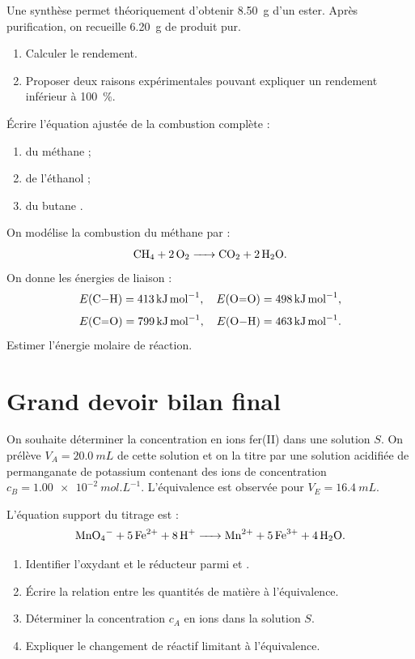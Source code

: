 \documentclass[11pt,a4paper]{article}
\begin{document}
\begin{exercicebox}[title=Exercice 10 - Rendement d'une synthèse]
Une synthèse permet théoriquement d'obtenir \SI{8.50}{g} d'un ester. Après purification, on recueille \SI{6.20}{g} de produit pur.
\begin{enumerate}
\item Calculer le rendement.
\item Proposer deux raisons expérimentales pouvant expliquer un rendement inférieur à \SI{100}{\percent}.
\end{enumerate}
\end{exercicebox}

\begin{exercicebox}[title=Exercice 11 - Combustion complète]
Écrire l'équation ajustée de la combustion complète :
\begin{enumerate}
\item du méthane  ;
\item de l'éthanol  ;
\item du butane .
\end{enumerate}
\end{exercicebox}

\begin{exercicebox}[title=Exercice 12 - Énergie de combustion]
On modélise la combustion du méthane par :
\[
\ce{CH4 + 2O2 -> CO2 + 2H2O}.
\]
On donne les énergies de liaison :
\[
E(\ce{C-H})=\SI{413}{kJ.mol^{-1}},\quad E(\ce{O=O})=\SI{498}{kJ.mol^{-1}},
\]
\[
E(\ce{C=O})=\SI{799}{kJ.mol^{-1}},\quad E(\ce{O-H})=\SI{463}{kJ.mol^{-1}}.
\]
Estimer l'énergie molaire de réaction.
\end{exercicebox}

\newpage

\section{Grand devoir bilan final}

\begin{exercicebox}[title=Devoir bilan - Partie A : dosage et transformation chimique]
On souhaite déterminer la concentration en ions fer(II)  dans une solution $S$. On prélève $V_A=\SI{20.0}{mL}$ de cette solution et on la titre par une solution acidifiée de permanganate de potassium contenant des ions  de concentration $c_B=\SI{1.00e-2}{mol.L^{-1}}$. L'équivalence est observée pour $V_E=\SI{16.4}{mL}$.

L'équation support du titrage est :
\[
\ce{MnO4^- + 5Fe^{2+} + 8H+ -> Mn^{2+} + 5Fe^{3+} + 4H2O}.
\]
\begin{enumerate}
\item Identifier l'oxydant et le réducteur parmi  et .
\item Écrire la relation entre les quantités de matière à l'équivalence.
\item Déterminer la concentration $c_A$ en ions  dans la solution $S$.
\item Expliquer le changement de réactif limitant à l'équivalence.
\end{enumerate}
\end{exercicebox}
\end{document}

